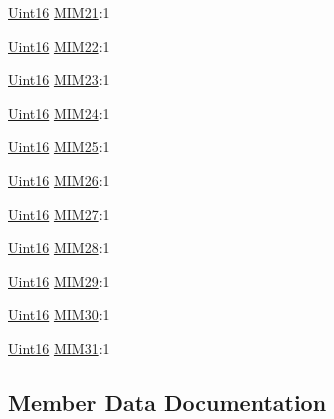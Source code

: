 \begin{DoxyCompactItemize}
\hyperlink{_d_s_p2833x___device_8h_a59a9f6be4562c327cbfb4f7e8e18f08b}{Uint16} \hyperlink{struct_c_a_n_m_i_m___b_i_t_s_a54a919374ad08ddf36cff8242f4f30f3}{M\+I\+M21}\+:1
\item 
\hyperlink{_d_s_p2833x___device_8h_a59a9f6be4562c327cbfb4f7e8e18f08b}{Uint16} \hyperlink{struct_c_a_n_m_i_m___b_i_t_s_a600e12875d7cfa218fcb062eb3b1f15b}{M\+I\+M22}\+:1
\item 
\hyperlink{_d_s_p2833x___device_8h_a59a9f6be4562c327cbfb4f7e8e18f08b}{Uint16} \hyperlink{struct_c_a_n_m_i_m___b_i_t_s_adaabea92b7e4966f421b0df00ea059fb}{M\+I\+M23}\+:1
\item 
\hyperlink{_d_s_p2833x___device_8h_a59a9f6be4562c327cbfb4f7e8e18f08b}{Uint16} \hyperlink{struct_c_a_n_m_i_m___b_i_t_s_a0ac791951ad03590ab2ce5ebe070e3db}{M\+I\+M24}\+:1
\item 
\hyperlink{_d_s_p2833x___device_8h_a59a9f6be4562c327cbfb4f7e8e18f08b}{Uint16} \hyperlink{struct_c_a_n_m_i_m___b_i_t_s_a9eef96062d1d02ce6e79e17f1500bcca}{M\+I\+M25}\+:1
\item 
\hyperlink{_d_s_p2833x___device_8h_a59a9f6be4562c327cbfb4f7e8e18f08b}{Uint16} \hyperlink{struct_c_a_n_m_i_m___b_i_t_s_a74656b3d29173d3097fd3aa268bd0742}{M\+I\+M26}\+:1
\item 
\hyperlink{_d_s_p2833x___device_8h_a59a9f6be4562c327cbfb4f7e8e18f08b}{Uint16} \hyperlink{struct_c_a_n_m_i_m___b_i_t_s_a9b2d1511cf58ff114d1879a57a670e63}{M\+I\+M27}\+:1
\item 
\hyperlink{_d_s_p2833x___device_8h_a59a9f6be4562c327cbfb4f7e8e18f08b}{Uint16} \hyperlink{struct_c_a_n_m_i_m___b_i_t_s_a22cd07be261f0431de2594099e9c71eb}{M\+I\+M28}\+:1
\item 
\hyperlink{_d_s_p2833x___device_8h_a59a9f6be4562c327cbfb4f7e8e18f08b}{Uint16} \hyperlink{struct_c_a_n_m_i_m___b_i_t_s_a1f3e697a9b169ac6982cbeadef1a1f0d}{M\+I\+M29}\+:1
\item 
\hyperlink{_d_s_p2833x___device_8h_a59a9f6be4562c327cbfb4f7e8e18f08b}{Uint16} \hyperlink{struct_c_a_n_m_i_m___b_i_t_s_ac637a7bd2597a18673fd6ef94a06f490}{M\+I\+M30}\+:1
\item 
\hyperlink{_d_s_p2833x___device_8h_a59a9f6be4562c327cbfb4f7e8e18f08b}{Uint16} \hyperlink{struct_c_a_n_m_i_m___b_i_t_s_a2a2fcf9534faed5f2d9b1519c096312b}{M\+I\+M31}\+:1
\end{DoxyCompactItemize}


\subsection{Member Data Documentation}
\hypertarget{struct_c_a_n_m_i_m___b_i_t_s_a864347be6c59d27517696aba6976421e}{}

